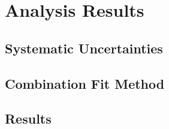 \chapter{Analysis Results}

\section{Systematic Uncertainties}

\section{Combination Fit Method}

\section{Results}
